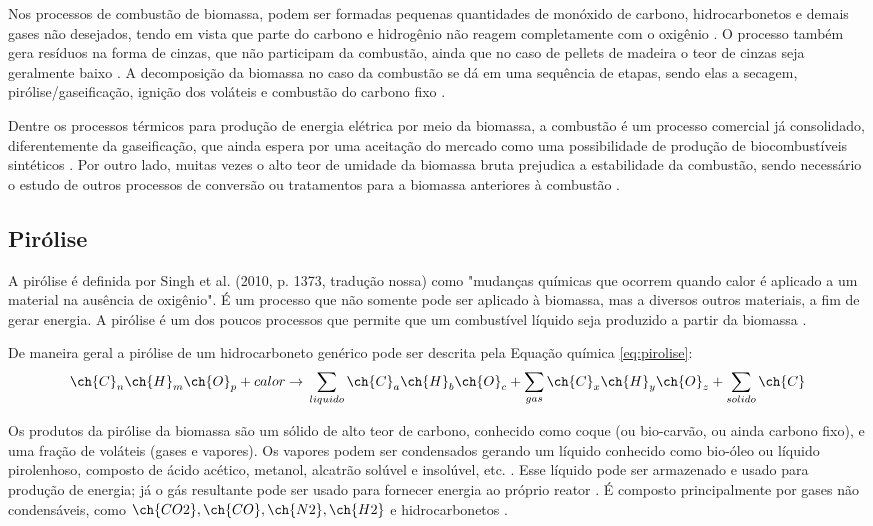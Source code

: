 Nos processos de combustão de biomassa, podem ser formadas pequenas quantidades de monóxido de carbono, hidrocarbonetos e demais gases não desejados, tendo em vista que parte do carbono e hidrogênio não reagem completamente com o oxigênio \cite{Brand}. O processo também gera resíduos na forma de cinzas, que não participam da combustão, ainda que no caso de pellets de madeira o teor de cinzas seja geralmente baixo \cite{Spliethoff}. A decomposição da biomassa no caso da combustão se dá em uma sequência de etapas, sendo elas a secagem, pirólise/gaseificação, ignição dos voláteis e combustão do carbono fixo \cite{Brand}.

Dentre os processos térmicos para produção de energia elétrica por meio da biomassa, a combustão é um processo comercial já consolidado, diferentemente da gaseificação, que ainda espera por uma aceitação do mercado como uma possibilidade de produção de biocombustíveis sintéticos \cite{Neves2017}. Por outro lado, muitas vezes o alto teor de umidade da biomassa bruta prejudica a estabilidade da combustão, sendo necessário o estudo de outros processos de conversão ou tratamentos para a biomassa anteriores à combustão \cite{Yaman2004}.

\subsection{Pirólise}
A pirólise é definida por Singh et al. (2010, p. 1373, tradução nossa) como "mudanças químicas que ocorrem quando calor é aplicado a um material na ausência de oxigênio". É um processo que não somente pode ser aplicado à biomassa, mas a diversos outros materiais, a fim de gerar energia. A pirólise é um dos poucos processos que permite que um combustível líquido seja produzido a partir da biomassa \cite{Basu}.

De maneira geral a pirólise de um hidrocarboneto genérico pode ser descrita pela Equação química \eqref{eq:pirolise}:
\begin{equation} \label{eq:pirolise}
\ch{C}_n \ch{H}_m \ch{O}_p + calor \rightarrow{} \sum_{liquido} \ch{C}_a \ch{H}_b \ch{O}_c + \sum_{gas} \ch{C}_x \ch{H}_y \ch{O}_z + \sum_{solido} \ch{C}
\end{equation}

Os produtos da pirólise da biomassa são um sólido de alto teor de carbono, conhecido como coque (ou bio-carvão, ou ainda carbono fixo), e uma fração de voláteis (gases e vapores). Os vapores podem ser condensados gerando um líquido conhecido como bio-óleo ou líquido pirolenhoso, composto de ácido acético, metanol, alcatrão solúvel e insolúvel, etc. \cite{Brand}. Esse líquido pode ser armazenado e usado para produção de energia; já o gás resultante pode ser usado para fornecer energia ao próprio reator \cite{Sharma2015}. É composto principalmente por gases não condensáveis, como $\ch{CO2}, \ch{CO}, \ch{N2}, \ch{H2}$ e hidrocarbonetos \cite{Brand}. 


